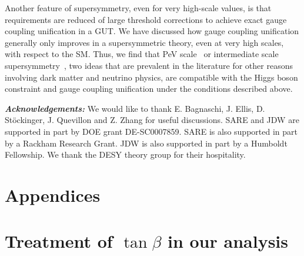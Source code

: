\documentclass[12pt]{article}
\begin{document}
Another feature of supersymmetry, even for very high-scale values, is that requirements are reduced of large threshold corrections to achieve exact gauge coupling unification in a GUT. We have discussed how gauge coupling unification generally only improves in a supersymmetric theory, even at very high scales, with respect to the SM. Thus, we find that PeV scale~\cite{Wells:2003tf, ArkaniHamed:2004fb, Giudice:2004tc,  ArkaniHamed:2004yi, Wells:2004di} or intermediate scale supersymmetry~\cite{Hall:2013eko, Hall:2014vga}, two ideas that are prevalent in the literature for other reasons involving dark matter and neutrino physics, are compatible with the Higgs boson constraint and gauge coupling unification under the conditions described above.
\vspace{1cm}

\noindent
{\textit{\textbf{Acknowledgements:}}} We would like to thank E. Bagnaschi, J. Ellis, D. St\"ockinger, J. Quevillon and Z. Zhang for useful discussions. SARE and JDW are supported in part by DOE grant DE-SC0007859. SARE is also supported in part by a Rackham Research Grant. JDW is also supported in part by a Humboldt Fellowship. We thank the DESY theory group for their hospitality. 

\section*{Appendices}

\appendix

\section{Treatment of $\tan\beta$ in our analysis}
\label{TB.APP}
\end{document}
